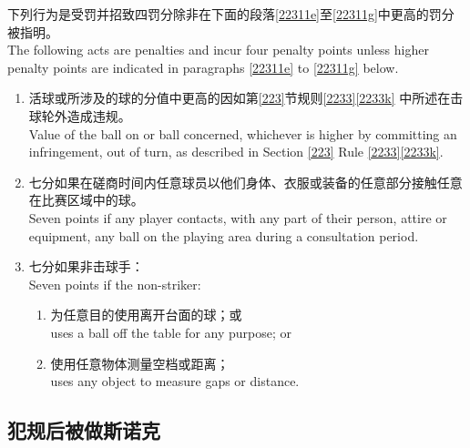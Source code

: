 \noindent 下列行为是受罚并招致四罚分除非在下面的段落\ref{22311e}至\ref{22311g}中更高的罚分被指明。\\
The following acts are penalties and incur four penalty points unless higher penalty points are indicated in paragraphs \ref{22311e} to \ref{22311g} below.
\begin{enumerate}[label=(\alph*),start=5]
    \item \label{22311e}活球或所涉及的球的分值中更高的因如第\ref{223}节规则\ref{2233}\ref{2233k} 中所述在击球轮外造成违规。\\
    Value of the ball on or ball concerned, whichever is higher by committing an infringement, out of turn, as described in Section \ref{223} Rule \ref{2233}\ref{2233k}.
    \item 七分如果在磋商时间内任意球员以他们身体、衣服或装备的任意部分接触任意在比赛区域中的球。\\
    Seven points if any player contacts, with any part of their person, attire or equipment, any ball on the playing area during a consultation period.
    \item \label{22311g}七分如果非击球手：\\
    Seven points if the non-striker:
    \begin{enumerate}[label=(\roman*)]
        \item 为任意目的使用离开台面的球；或\\
        uses a ball off the table for any purpose; or
        \item 使用任意物体测量空档或距离；\\
        uses any object to measure gaps or distance.
    \end{enumerate}
\end{enumerate}

\subsection{犯规后被做斯诺克}\label{22312}


